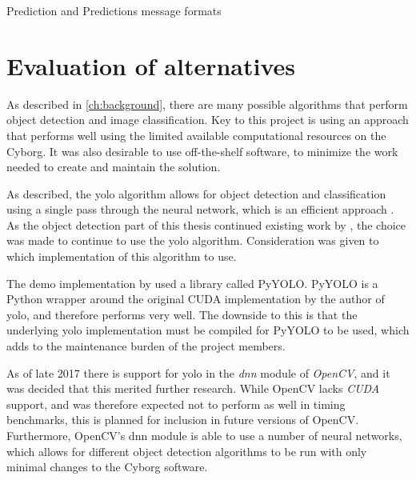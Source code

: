 \documentclass[\rootfolder/main.tex]{subfiles}
\begin{document}
\begin{listing}
    \inputminted{python}{\rootfolder/Chapters/Chapter5/Listings/Prediction.msg}
    \inputminted{python}{\rootfolder/Chapters/Chapter5/Listings/Predictions.msg}
    \caption{Prediction and Predictions message formats\label{lst:prediction-msg}}
\end{listing}


\section{Evaluation of alternatives}

As described in \cref{ch:background}, there are many possible algorithms that perform object detection and image classification.
Key to this project is using an approach that performs well using the limited available computational resources on the Cyborg.
It was also desirable to use off-the-shelf software, to minimize the work needed to create and maintain the solution.

As described, the \acrshort{yolo} algorithm allows for object detection and classification using a single pass through the neural network, which is an efficient approach \cite{Redmon2015}.
As the object detection part of this thesis continued existing work by \cite{Opheim2018}, the choice was made to continue to use the \acrshort{yolo} algorithm.
Consideration was given to which implementation of this algorithm to use.

The demo implementation by \cite{Opheim2018} used a library called PyYOLO.
PyYOLO is a Python wrapper around the original CUDA implementation by the author of \acrshort{yolo}, and therefore performs very well.
The downside to this is that the underlying \acrshort{yolo} implementation must be compiled for PyYOLO to be used, which adds to the maintenance burden of the project members.

As of late 2017 there is support for \acrshort{yolo} in the \emph{\acrfull{dnn}} module of \emph{OpenCV}, and it was decided that this merited further research.
While OpenCV lacks \emph{CUDA} support, and was therefore expected not to perform as well in timing benchmarks, this is planned for inclusion in future versions of OpenCV.
Furthermore, OpenCV's \acrshort{dnn} module is able to use a number of neural networks, which allows for different object detection algorithms to be run with only minimal changes to the Cyborg software.
\end{document}
